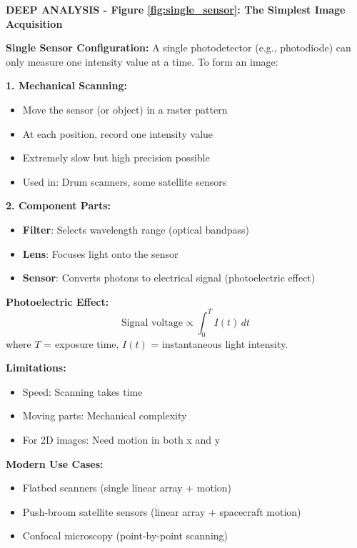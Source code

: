 \documentclass[12pt,a4paper]{article}
\begin{document}
\begin{deepexplanation}
\textbf{DEEP ANALYSIS - Figure \ref{fig:single_sensor}: The Simplest Image Acquisition}

\textbf{Single Sensor Configuration:}
A single photodetector (e.g., photodiode) can only measure one intensity value at a time. To form an image:

\textbf{1. Mechanical Scanning:}
\begin{itemize}
    \item Move the sensor (or object) in a raster pattern
    \item At each position, record one intensity value
    \item Extremely slow but high precision possible
    \item Used in: Drum scanners, some satellite sensors
\end{itemize}

\textbf{2. Component Parts:}
\begin{itemize}
    \item \textbf{Filter}: Selects wavelength range (optical bandpass)
    \item \textbf{Lens}: Focuses light onto the sensor
    \item \textbf{Sensor}: Converts photons to electrical signal (photoelectric effect)
\end{itemize}

\textbf{Photoelectric Effect:}
\[
\text{Signal voltage} \propto \int_0^T I(t) \, dt
\]
where $T$ = exposure time, $I(t)$ = instantaneous light intensity.

\textbf{Limitations:}
\begin{itemize}
    \item Speed: Scanning takes time
    \item Moving parts: Mechanical complexity
    \item For 2D images: Need motion in both x and y
\end{itemize}

\textbf{Modern Use Cases:}
\begin{itemize}
    \item Flatbed scanners (single linear array + motion)
    \item Push-broom satellite sensors (linear array + spacecraft motion)
    \item Confocal microscopy (point-by-point scanning)
\end{itemize}
\end{deepexplanation}
\end{document}
